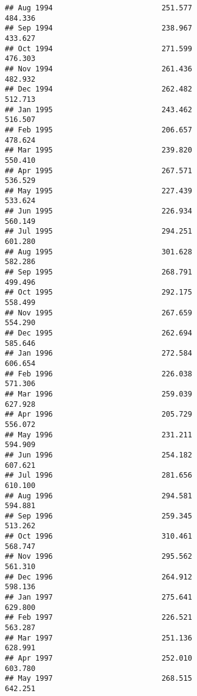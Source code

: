 \documentclass[
]{article}
\begin{document}
\begin{verbatim}
## Aug 1994                         251.577                           484.336
## Sep 1994                         238.967                           433.627
## Oct 1994                         271.599                           476.303
## Nov 1994                         261.436                           482.932
## Dec 1994                         262.482                           512.713
## Jan 1995                         243.462                           516.507
## Feb 1995                         206.657                           478.624
## Mar 1995                         239.820                           550.410
## Apr 1995                         267.571                           536.529
## May 1995                         227.439                           533.624
## Jun 1995                         226.934                           560.149
## Jul 1995                         294.251                           601.280
## Aug 1995                         301.628                           582.286
## Sep 1995                         268.791                           499.496
## Oct 1995                         292.175                           558.499
## Nov 1995                         267.659                           554.290
## Dec 1995                         262.694                           585.646
## Jan 1996                         272.584                           606.654
## Feb 1996                         226.038                           571.306
## Mar 1996                         259.039                           627.928
## Apr 1996                         205.729                           556.072
## May 1996                         231.211                           594.909
## Jun 1996                         254.182                           607.621
## Jul 1996                         281.656                           610.100
## Aug 1996                         294.581                           594.881
## Sep 1996                         259.345                           513.262
## Oct 1996                         310.461                           568.747
## Nov 1996                         295.562                           561.310
## Dec 1996                         264.912                           598.136
## Jan 1997                         275.641                           629.800
## Feb 1997                         226.521                           563.287
## Mar 1997                         251.136                           628.991
## Apr 1997                         252.010                           603.780
## May 1997                         268.515                           642.251

\end{verbatim}
\end{document}
